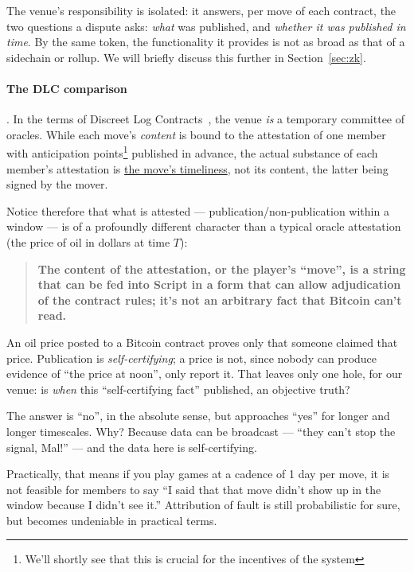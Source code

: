 \documentclass[11pt]{article}
\begin{document}
The venue's responsibility is isolated: it answers, per move of each contract, the two questions a dispute asks:
\emph{what} was published, and \emph{whether it was published in time}. By the same token, the functionality it provides is not as broad as that of a sidechain or rollup. We will briefly discuss this further in Section~\ref{sec:zk}.

\paragraph{The DLC comparison}. In the terms of Discreet
Log Contracts~\cite{dlc}, the venue \emph{is} a temporary committee of oracles. While each move's \emph{content} is bound to the attestation of one member with anticipation points\footnote{We'll shortly see that this is crucial for the incentives of the system} published in advance, the actual substance of each member's attestation is \underline{the move's timeliness}, not its content, the latter being signed by the mover.

Notice therefore that what is attested --- publication/non-publication within a window --- is of a profoundly different character than a typical oracle attestation (the price of oil in dollars at time $T$):

\begin{quote}
\textbf{The content of the attestation, or the player's ``move'', is a string that can be fed into Script in a form that can allow adjudication of the contract rules; it's not an arbitrary fact that Bitcoin can't read.}
\end{quote}

An oil price posted to a Bitcoin contract proves only that someone claimed that price. Publication is \emph{self-certifying}; a price is not, since nobody can produce evidence of ``the price at noon'', only report it. That leaves only one hole, for our venue: is \emph{when} this ``self-certifying fact'' published, an objective truth?

The answer is ``no'', in the absolute sense, but approaches ``yes'' for longer and longer timescales. Why? Because data can be broadcast --- ``they can't stop the signal, Mal!'' --- and the data here is self-certifying.

Practically, that means if you play games at a cadence of 1 day per move, it is not feasible for members to say ``I said that that move didn't show up in the window because I didn't see it.'' Attribution of fault is still probabilistic for sure, but becomes undeniable in practical terms.
\end{document}
